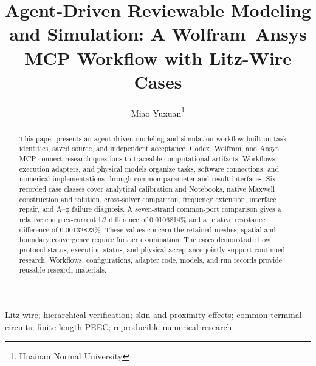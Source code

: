 \documentclass[journal,10pt]{IEEEtran}
\title{Agent-Driven Reviewable Modeling and Simulation: A Wolfram–Ansys MCP Workflow with Litz-Wire Cases}
\author{Miao Yuxuan\thanks{Huainan Normal University}}
\date{}
\begin{document}
\maketitle
\begin{abstract}
This paper presents an agent-driven modeling and simulation workflow built on task identities, saved source, and independent acceptance. Codex, Wolfram, and Ansys MCP connect research questions to traceable computational artifacts. Workflows, execution adapters, and physical models organize tasks, software connections, and numerical implementations through common parameter and result interfaces. Six recorded case classes cover analytical calibration and Notebooks, native Maxwell construction and solution, cross-solver comparison, frequency extension, interface repair, and A–φ failure diagnosis. A seven-strand common-port comparison gives a relative complex-current L2 difference of 0.0106814\% and a relative resistance difference of 0.00132823\%. These values concern the retained meshes; spatial and boundary convergence require further examination. The cases demonstrate how protocol status, execution status, and physical acceptance jointly support continued research. Workflows, configurations, adapter code, models, and run records provide reusable research materials.
\end{abstract}
\begin{IEEEkeywords}
Litz wire; hierarchical verification; skin and proximity effects; common-terminal circuits; finite-length PEEC; reproducible numerical research
\end{IEEEkeywords}








\renewcommand{\refname}{References}

\end{document}
